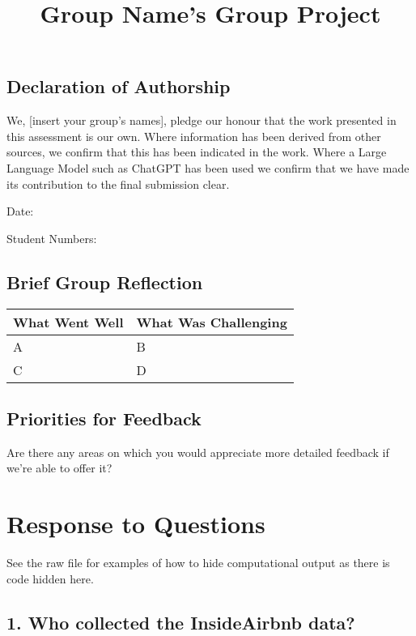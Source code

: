 \documentclass[
  a4paper,
  DIV=11,
  numbers=noendperiod]{scrartcl}
\title{Group Name's Group Project}
\author{}
\date{}
\begin{document}
\maketitle


\subsection*{Declaration of Authorship}\label{declaration-of-authorship}

We, {[}insert your group's names{]}, pledge our honour that the work
presented in this assessment is our own. Where information has been
derived from other sources, we confirm that this has been indicated in
the work. Where a Large Language Model such as ChatGPT has been used we
confirm that we have made its contribution to the final submission
clear.

Date:

Student Numbers:

\subsection{Brief Group Reflection}\label{brief-group-reflection}

\begin{longtable}[]{@{}ll@{}}
\toprule\noalign{}
What Went Well & What Was Challenging \\
\midrule\noalign{}
\endhead
\bottomrule\noalign{}
\endlastfoot
A & B \\
C & D \\
\end{longtable}

\subsection{Priorities for Feedback}\label{priorities-for-feedback}

Are there any areas on which you would appreciate more detailed feedback
if we're able to offer it?

\newpage{}

\section{Response to Questions}\label{response-to-questions}

See the raw file for examples of how to hide computational output as
there is code hidden here.

\subsection{1. Who collected the InsideAirbnb
data?}\label{who-collected-the-insideairbnb-data}
\end{document}
